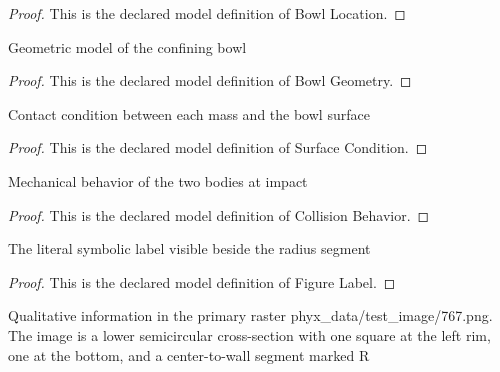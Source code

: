 \begin{proof}
  This is the declared model definition of Bowl Location.
\end{proof}
\begin{definition}
  \label{def:physics:phyx-mini-0767:phyxminiproblems-problemphyxmini0767-bowlgeometry}
  Geometric model of the confining bowl
\end{definition}
\begin{proof}
  This is the declared model definition of Bowl Geometry.
\end{proof}
\begin{definition}
  \label{def:physics:phyx-mini-0767:phyxminiproblems-problemphyxmini0767-surfacecondition}
  Contact condition between each mass and the bowl surface
\end{definition}
\begin{proof}
  This is the declared model definition of Surface Condition.
\end{proof}
\begin{definition}
  \label{def:physics:phyx-mini-0767:phyxminiproblems-problemphyxmini0767-collisionbehavior}
  Mechanical behavior of the two bodies at impact
\end{definition}
\begin{proof}
  This is the declared model definition of Collision Behavior.
\end{proof}
\begin{definition}
  \label{def:physics:phyx-mini-0767:phyxminiproblems-problemphyxmini0767-figurelabel}
  The literal symbolic label visible beside the radius segment
\end{definition}
\begin{proof}
  This is the declared model definition of Figure Label.
\end{proof}
\begin{definition}
  \label{def:physics:phyx-mini-0767:phyxminiproblems-problemphyxmini0767-hemisphericalbowlfigure}
  Qualitative information in the primary raster phyx\_data/test\_image/767.png. The image is a lower semicircular cross-section with one square at the left rim, one at the bottom, and a center-to-wall segment marked R
\end{definition}

